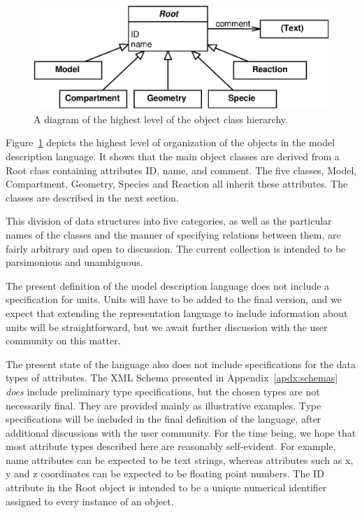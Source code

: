 \documentclass[10pt]{article}
\newcommand{\class}[1]{\textsf{#1}}
\newcommand{\attrib}[1]{\textsf{#1}}
\begin{document}
\begin{figure}
  \centering
  \includegraphics[scale = 0.75]{top-level.eps}
  \caption{A diagram of the highest level of the object class hierarchy.}
  \label{fig:top-level}
\end{figure}

Figure~\ref{fig:top-level} depicts the highest level of organization of the
objects in the model description language.  It shows that the main object
classes are derived from a \class{Root} class containing attributes
\attrib{ID}, \attrib{name}, and \attrib{comment}.  The five classes,
\class{Model}, \class{Compartment}, \class{Geometry}, \class{Species} and
\class{Reaction} all inherit these attributes.  The classes are described
in the next section.

This division of data structures into five categories, as well as the
particular names of the classes and the manner of specifying relations
between them, are fairly arbitrary and open to discussion.  The current
collection is intended to be parsimonious and unambiguous.

The present definition of the model description language does not include a
specification for units.  Units will have to be added to the final version,
and we expect that extending the representation language to include
information about units will be straightforward, but we await further
discussion with the user community on this matter.

The present state of the language also does not include specifications for
the data types of attributes.  The XML Schema presented in
Appendix~\ref{apdx:schemas} \emph{does} include preliminary type
specifications, but the chosen types are not necessarily final.  They are
provided mainly as illustrative examples.  Type specifications will be
included in the final definition of the language, after additional
discussions with the user community.  For the time being, we hope that most
attribute types described here are reasonably self-evident.  For example,
\attrib{name} attributes can be expected to be text strings, whereas
attributes such as \attrib{x}, \attrib{y} and \attrib{z} coordinates can be
expected to be floating point numbers.  The \attrib{ID} attribute in the
\class{Root} object is intended to be a unique numerical identifier
assigned to every instance of an object.
\end{document}
